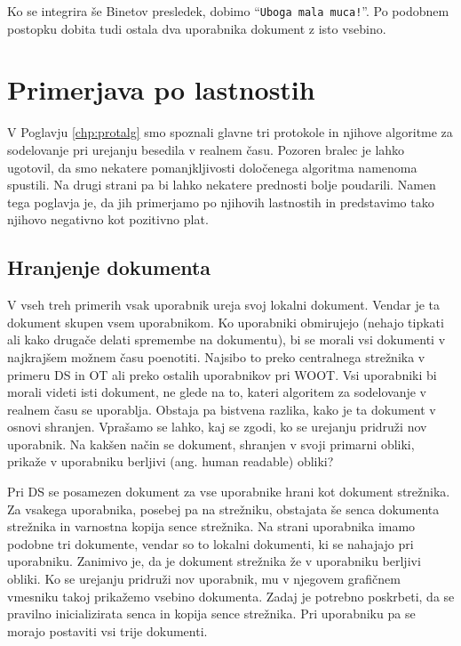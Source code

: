 \documentclass[a4paper, 12pt, twoside]{book}
\begin{document}
Ko se integrira še Binetov presledek, dobimo “{\tt Uboga mala muca!}”. Po podobnem postopku dobita tudi ostala dva uporabnika dokument z isto vsebino.

\chapter{Primerjava po lastnostih}

V Poglavju \ref{chp:protalg} smo spoznali glavne tri protokole in njihove algoritme za sodelovanje pri urejanju besedila v realnem času. Pozoren bralec je lahko ugotovil, da smo nekatere pomanjkljivosti določenega algoritma namenoma spustili. Na drugi strani pa bi lahko nekatere prednosti bolje poudarili. Namen tega poglavja je, da jih primerjamo po njihovih lastnostih in predstavimo tako njihovo negativno kot pozitivno plat.

\section{Hranjenje dokumenta}

V vseh treh primerih vsak uporabnik ureja svoj lokalni dokument. Vendar je ta dokument skupen vsem uporabnikom. Ko uporabniki obmirujejo (nehajo tipkati ali kako drugače delati spremembe na dokumentu), bi se morali vsi dokumenti v najkrajšem možnem času poenotiti. Najsibo to preko centralnega strežnika v primeru DS in OT ali preko ostalih uporabnikov pri WOOT. Vsi uporabniki bi morali videti isti dokument, ne glede na to, kateri algoritem za sodelovanje v realnem času se uporablja. Obstaja pa bistvena razlika, kako je ta dokument v osnovi shranjen. Vprašamo se lahko, kaj se zgodi, ko se urejanju pridruži nov uporabnik. Na kakšen način se dokument, shranjen v svoji primarni obliki, prikaže v uporabniku berljivi (ang. human readable) obliki?

Pri DS se posamezen dokument za vse uporabnike hrani kot dokument strežnika. Za vsakega uporabnika, posebej pa na strežniku, obstajata še senca dokumenta strežnika in varnostna kopija sence strežnika. Na strani uporabnika imamo podobne tri dokumente, vendar so to lokalni dokumenti, ki se nahajajo pri uporabniku. Zanimivo je, da je dokument strežnika že v uporabniku berljivi obliki. Ko se urejanju pridruži nov uporabnik, mu v njegovem grafičnem vmesniku takoj prikažemo vsebino dokumenta. Zadaj je potrebno poskrbeti, da se pravilno inicializirata senca in kopija sence strežnika. Pri uporabniku pa se morajo postaviti vsi trije dokumenti.
\end{document}
